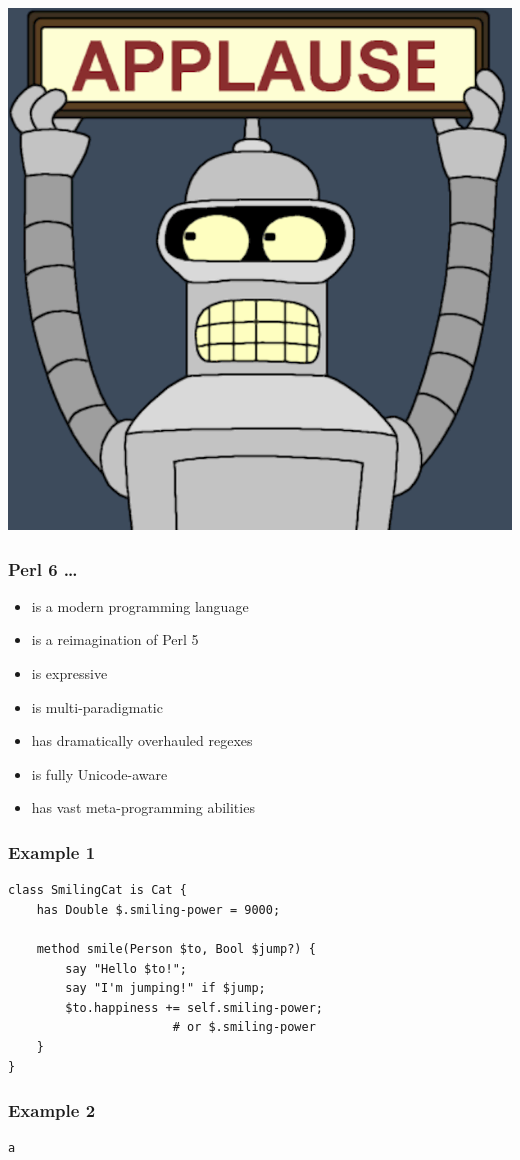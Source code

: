 \documentclass[14pt,compress,english,utf8,t]{beamer}
\begin{document}
\begin{frame}[plain,c]
  \centering
  \includegraphics[scale=0.4]{images/applause}
  \par
\end{frame}

\begin{frame}\frametitle{Perl 6 \ldots}
  \begin{itemize}
    \item is a modern programming language
    \item is a reimagination of Perl 5
    \item is expressive
    \item is multi-paradigmatic
    \item has dramatically overhauled regexes
    \item is fully Unicode-aware
    \item has vast meta-programming abilities
  \end{itemize}
\end{frame}

\begin{frame}[fragile]\frametitle{Example 1}
  \begin{verbatim}
class SmilingCat is Cat {
    has Double $.smiling-power = 9000;

    method smile(Person $to, Bool $jump?) {
        say "Hello $to!";
        say "I'm jumping!" if $jump;
        $to.happiness += self.smiling-power;
                       # or $.smiling-power
    }
}
  \end{verbatim}
\end{frame}

\begin{frame}[fragile]\frametitle{Example 2}
  \begin{verbatim}
a
  \end{verbatim}
\end{frame}

\end{document}
